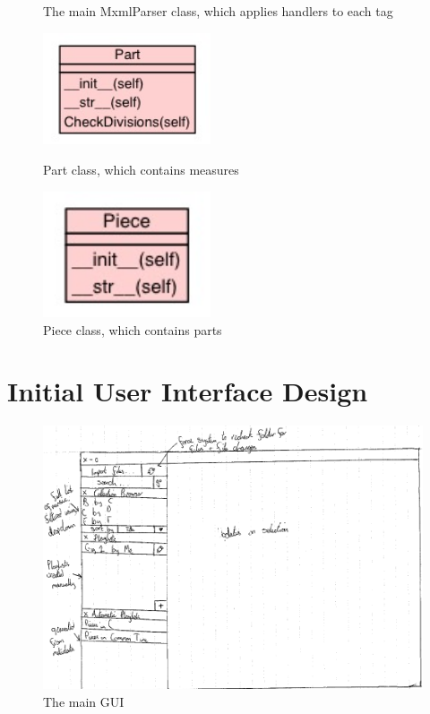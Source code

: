 \begin{appendices}
\begin{figure}[H]
\begin{minipage}{160pt}
\caption{The main MxmlParser class, which applies handlers to each tag}
\label{fig:mxmlparse}
\end{minipage}
\begin{minipage}{160pt}
\includegraphics[width=140pt]{diagrams/jpegs/uml_class_diagram_for_implemen_66}	
\caption{Part class, which contains measures}
\label{fig:partclass}
\end{minipage}
\begin{minipage}{160pt}
\includegraphics[width=140pt]{diagrams/jpegs/uml_class_diagram_for_implemen_67}	
\caption{Piece class, which contains parts}
\label{fig:piececlass}
\end{minipage}
\end{figure}
\section{Initial User Interface Design}
\begin{figure}[Hz]
	\centering
	\includegraphics[width=400pt]{designs/main}
	\caption{The main GUI}
	\label{fig:m}	
\end{figure}


\end{appendices}
